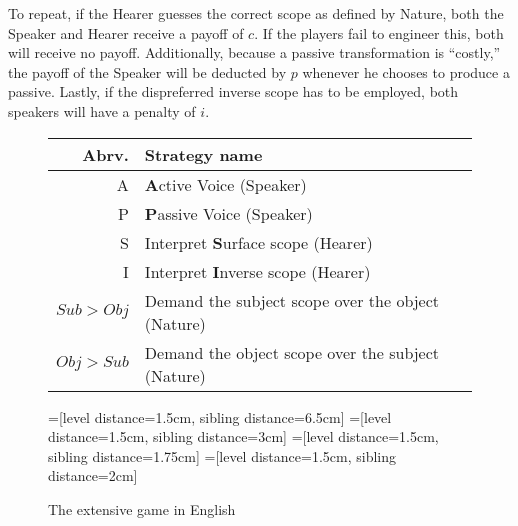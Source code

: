 \documentclass{article}
\begin{document}
To repeat, if the Hearer guesses the correct scope as defined by Nature, both the Speaker and Hearer receive a payoff of $c$.
If the players fail to engineer this, both will receive no payoff.
Additionally, because a passive transformation is ``costly,'' the payoff of the Speaker will be deducted by $p$ whenever he chooses to produce a passive.
Lastly, if the dispreferred inverse scope has to be employed, both speakers will have a penalty of $i$.

\begin{figure}
	\begin{tabular}{r||l}
		Abrv.& Strategy name\\\hline\hline
		A & \textbf{A}ctive Voice (Speaker)\\
		P & \textbf{P}assive Voice (Speaker)\\
		S & Interpret \textbf{S}urface scope (Hearer)\\
		I & Interpret \textbf{I}nverse scope (Hearer)\\
		$Sub > Obj$ & Demand the subject scope over the object (Nature)\\
		$Obj > Sub$ & Demand the object scope over the subject (Nature)\\
	\end{tabular}
\end{figure}


\begin{figure}
\begin{center}
=[level distance=1.5cm, sibling distance=6.5cm]
=[level distance=1.5cm, sibling distance=3cm]
=[level distance=1.5cm, sibling distance=1.75cm]
=[level distance=1.5cm, sibling distance=2cm]
\end{center}
\caption{The extensive game\label{exten} in English}
\end{figure}
\end{document}
